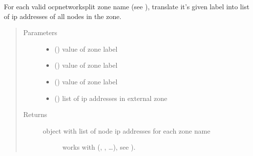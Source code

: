 \documentclass[letterpaper,10pt,english]{sphinxmanual}
\begin{document}

\begin{fulllineitems}
\label{\detokenize{ocpnetsplit:ocpnetsplit.main.get_zone_config}}
For each valid ocp\sphinxhyphen{}network\sphinxhyphen{}split zone name (see
{\hyperref[\detokenize{ocpnetsplit:ocpnetsplit.zone.ZONES}]{}}), translate it’s given
 label into list of ip addresses of all
nodes in the zone.
\begin{quote}\begin{description}
\item[{Parameters}] \leavevmode\begin{itemize}
\item {} 
 () \textendash{} value of zone  label

\item {} 
 () \textendash{} value of zone  label

\item {} 
 () \textendash{} value of zone  label

\item {} 
 () \textendash{} list of ip addresses in external zone 

\end{itemize}

\item[{Returns}] \leavevmode
\begin{description}
\item[{object with list of node ip addresses for each zone name}] \leavevmode
{} works with (, , …),
see {\hyperref[\detokenize{ocpnetsplit:ocpnetsplit.zone.ZONES}]{}}).


\end{description}
\end{description}
\end{quote}
\end{fulllineitems}
\end{document}
